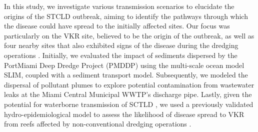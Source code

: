 \documentclass[preprint,12pt,authoryear]{elsarticle}
\begin{document}
In this study, we investigate various transmission scenarios to elucidate the origins of the STCLD outbreak, aiming to identify the pathways through which the disease could have spread to the initially affected sites. Our focus was particularly on the VKR site, believed to be the origin of the outbreak, as well as four nearby sites that also exhibited signs of the disease during the dredging operations \citep{precht2016unprecedented}. Initially, we evaluated the impact of sediments dispersed by the PortMiami Deep Dredge Project (PMDDP) using the multi-scale ocean model SLIM, coupled with a sediment transport model. Subsequently, we modeled the dispersal of pollutant plumes to explore potential contamination from wastewater leaks at the Miami Central Municipal WWTP’s discharge pipe. Lastly, given the potential for waterborne transmission of SCTLD \citep{aeby2019pathogenesis,eaton2021measuring, meiling2021variable}, we used a previously validated hydro-epidemiological model to assess the likelihood of disease spread to VKR from reefs affected by non-conventional dredging operations \citep{dobbelaere2022connecting}.

\end{document}
